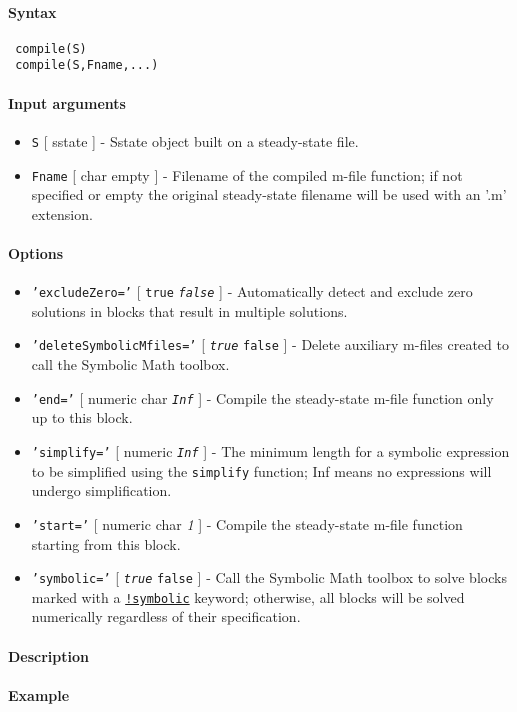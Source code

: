 


	\paragraph{Syntax}
 
 \begin{verbatim}
 compile(S)
 compile(S,Fname,...)
 \end{verbatim}
 
 \paragraph{Input arguments}
 
 \begin{itemize}
 \item
   \texttt{S} {[} sstate {]} - Sstate object built on a steady-state
   file.
 \item
   \texttt{Fname} {[} char \textbar{} empty {]} - Filename of the
   compiled m-file function; if not specified or empty the original
   steady-state filename will be used with an '.m' extension.
 \end{itemize}
 
 \paragraph{Options}
 
 \begin{itemize}
 \item
   \texttt{'excludeZero='} {[} \texttt{true} \textbar{}
   \emph{\texttt{false}} {]} - Automatically detect and exclude zero
   solutions in blocks that result in multiple solutions.
 \item
   \texttt{'deleteSymbolicMfiles='} {[} \emph{\texttt{true}} \textbar{}
   \texttt{false} {]} - Delete auxiliary m-files created to call the
   Symbolic Math toolbox.
 \item
   \texttt{'end='} {[} numeric \textbar{} char \textbar{}
   \emph{\texttt{Inf}} {]} - Compile the steady-state m-file function
   only up to this block.
 \item
   \texttt{'simplify='} {[} numeric \textbar{} \emph{\texttt{Inf}} {]} -
   The minimum length for a symbolic expression to be simplified using
   the \texttt{simplify} function; Inf means no expressions will undergo
   simplification.
 \item
   \texttt{'start='} {[} numeric \textbar{} char \textbar{} \emph{1} {]}
   - Compile the steady-state m-file function starting from this block.
 \item
   \texttt{'symbolic='} {[} \emph{\texttt{true}} \textbar{}
   \texttt{false} {]} - Call the Symbolic Math toolbox to solve blocks
   marked with a \href{sstatelang/symbolic}{\texttt{!symbolic}} keyword;
   otherwise, all blocks will be solved numerically regardless of their
   specification.
 \end{itemize}
 
 \paragraph{Description}
 
 \paragraph{Example}


